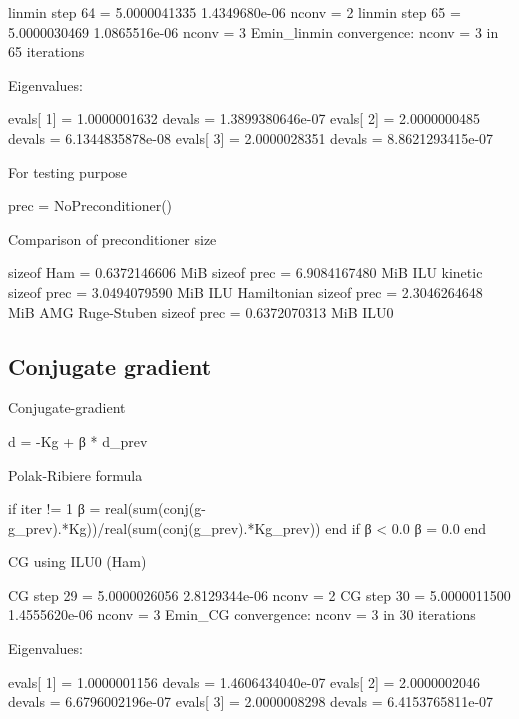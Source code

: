 \begin{textcode}
linmin step       64 =       5.0000041335   1.4349680e-06  nconv =     2
linmin step       65 =       5.0000030469   1.0865516e-06  nconv =     3
Emin_linmin convergence: nconv =     3 in    65 iterations

Eigenvalues:

evals[  1] =       1.0000001632 devals =   1.3899380646e-07
evals[  2] =       2.0000000485 devals =   6.1344835878e-08
evals[  3] =       2.0000028351 devals =   8.8621293415e-07
\end{textcode}


For testing purpose
\begin{juliacode}
prec = NoPreconditioner()
\end{juliacode}

Comparison of preconditioner size
\begin{textcode}
sizeof Ham  =       0.6372146606 MiB
sizeof prec =       6.9084167480 MiB  ILU kinetic
sizeof prec =       3.0494079590 MiB  ILU Hamiltonian
sizeof prec =       2.3046264648 MiB  AMG Ruge-Stuben
sizeof prec =       0.6372070313 MiB  ILU0
\end{textcode}


\subsection{Conjugate gradient}

Conjugate-gradient

\begin{textcode}
d = -Kg + β * d_prev
\end{textcode}

Polak-Ribiere formula
\begin{juliacode}
if iter != 1
    β = real(sum(conj(g-g_prev).*Kg))/real(sum(conj(g_prev).*Kg_prev))
end
if β < 0.0 β = 0.0 end
\end{juliacode}

CG using ILU$0$ (Ham)
\begin{textcode}
CG step       29 =       5.0000026056   2.8129344e-06  nconv =     2
CG step       30 =       5.0000011500   1.4555620e-06  nconv =     3
Emin_CG convergence: nconv =     3 in    30 iterations
  
Eigenvalues:
  
evals[  1] =       1.0000001156 devals =   1.4606434040e-07
evals[  2] =       2.0000002046 devals =   6.6796002196e-07
evals[  3] =       2.0000008298 devals =   6.4153765811e-07  
\end{textcode}


